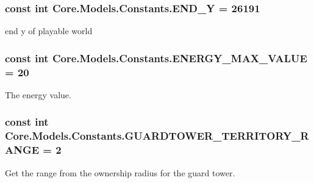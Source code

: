 \subsubsection[{E\+N\+D\+\_\+\+Y}]{\setlength{\rightskip}{0pt plus 5cm}const int Core.\+Models.\+Constants.\+E\+N\+D\+\_\+\+Y = 26191}\label{classCore_1_1Models_1_1Constants_ae2cd96ff453731f63095739737f184b4}


end y of playable world 

\hypertarget{classCore_1_1Models_1_1Constants_a73dd9150d21d41b1e61af6c163d8cb6c}{}
\subsubsection[{E\+N\+E\+R\+G\+Y\+\_\+\+M\+A\+X\+\_\+\+V\+A\+L\+U\+E}]{\setlength{\rightskip}{0pt plus 5cm}const int Core.\+Models.\+Constants.\+E\+N\+E\+R\+G\+Y\+\_\+\+M\+A\+X\+\_\+\+V\+A\+L\+U\+E = 20}\label{classCore_1_1Models_1_1Constants_a73dd9150d21d41b1e61af6c163d8cb6c}


The energy value. 

\hypertarget{classCore_1_1Models_1_1Constants_a64ce972b2af4cf4888944e71e9086dca}{}
\subsubsection[{G\+U\+A\+R\+D\+T\+O\+W\+E\+R\+\_\+\+T\+E\+R\+R\+I\+T\+O\+R\+Y\+\_\+\+R\+A\+N\+G\+E}]{\setlength{\rightskip}{0pt plus 5cm}const int Core.\+Models.\+Constants.\+G\+U\+A\+R\+D\+T\+O\+W\+E\+R\+\_\+\+T\+E\+R\+R\+I\+T\+O\+R\+Y\+\_\+\+R\+A\+N\+G\+E = 2}\label{classCore_1_1Models_1_1Constants_a64ce972b2af4cf4888944e71e9086dca}


Get the range from the ownership radius for the guard tower. 

